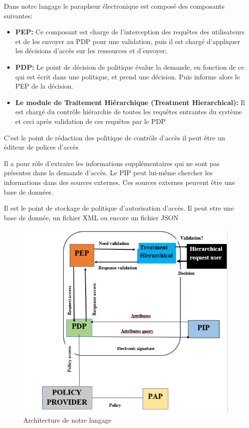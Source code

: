 Dans notre langage le parapheur électronique est composé des composants suivantes:
\begin{itemize}
\item \textbf{PEP:} Ce composant est charge de l'interception des requêtes des utilisateurs et de les envoyer au PDP pour une validation, puis il est chargé d'appliquer les décisions d'accès sur les ressources et d'envoyer;
\item \textbf{PDP:} Le point de décision de politique évalue la demande, en fonction de ce qui est écrit dans une politique, et prend une décision. Puis informe alors le PEP de la décision. 
\item \textbf{Le module de Traitement Hiérarchique (Treatment Hierarchical):} Il est chargé du contrôle hiérarchie de toutes les requêtes entrantes du système et ceci après validation de ces requêtes par le PDP
\end{itemize}

\label{sectionParapheurE} C'est le point de rédaction des politique de contrôle d'accès il peut être un éditeur de polices d'accès

\label{sectionParapheurE} Il a  pour rôle d'extraire les informations supplémentaires qui ne sont pas présentes dans la demande d'accès. Le PIP peut lui-même chercher les informations dans des sources externes. Ces sources externes peuvent être une base de données.

\label{sectionParapheurE}
 Il est le point de stockage de politique d'autorisation d'accès. Il peut etre une base de donnée, un fichier XML ou encore un fichier JSON

\begin{figure}[h!]
    \centering
		\includegraphics[scale=0.7]{chap4/images/architecture.png}
    \caption{Architecture de notre langage}
	 \label{figArchie}
\end{figure} 

